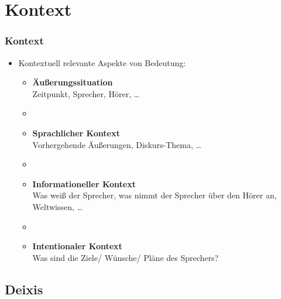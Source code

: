 %
\section{Kontext}
%

\begin{frame}
\frametitle{Kontext}

\begin{itemize}
	\item Kontextuell relevante Aspekte von Bedeutung:
	
\vspace{5mm}
	
	\begin{itemize}
		\item \textbf{Äu\ss{}erungssituation} \\
Zeitpunkt, Sprecher, Hörer, \dots
		\item []
		\item \textbf{Sprachlicher Kontext}\\
Vorhergehende Äu\ss{}erungen, Diskurs-Thema, \dots
		\item[]
		\item \textbf{Informationeller Kontext} \\
Was wei\ss{} der Sprecher, was nimmt der Sprecher über den Hörer an, Weltwissen, \dots
		\item []
		\item \textbf{Intentionaler Kontext} \\
Was sind die Ziele/ Wünsche/ Pläne des Sprechers?
	\end{itemize}
	
\end{itemize}

\end{frame}


%
\subsection{Deixis}
%

